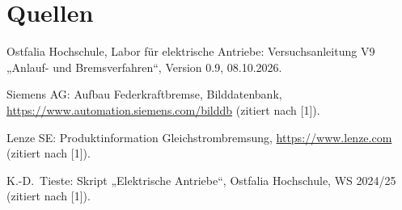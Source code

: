 \documentclass[11pt,a4paper]{article}
\begin{document}
\sloppy
\section*{Quellen}
\begin{enumerate}[label={[\arabic*]}]
\item Ostfalia Hochschule, Labor für elektrische Antriebe: Versuchsanleitung V9
      „Anlauf- und Bremsverfahren“, Version 0.9, 08.10.2026.
\item Siemens AG: Aufbau Federkraftbremse, Bilddatenbank,
      \url{https://www.automation.siemens.com/bilddb} (zitiert nach [1]).
\item Lenze SE: Produktinformation Gleichstrombremsung,
      \url{https://www.lenze.com} (zitiert nach [1]).
\item K.-D.\ Tieste: Skript „Elektrische Antriebe“, Ostfalia Hochschule, WS 2024/25 (zitiert nach [1]).
\end{enumerate}
\end{document}
